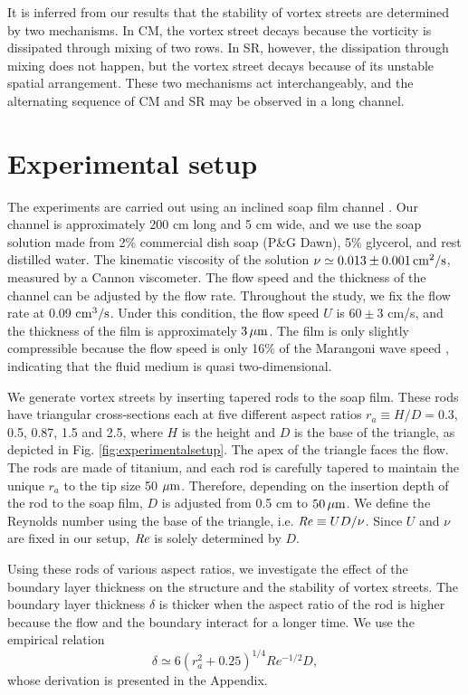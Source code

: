 \documentclass[english, aps, prl, longbibliography, preprint]{revtex4-1}
\newcommand\citepar\citep
\newcommand\micron{{\rm \mu m}}
\newcommand\Reynolds{{\it Re}}
\begin{document}
It is inferred from our results that the stability of vortex streets are determined by two mechanisms.
In CM, the vortex street decays because the vorticity is dissipated through mixing of two rows.
In SR, however, the dissipation through mixing does not happen, but the vortex street decays because of its unstable spatial arrangement.
These two mechanisms act interchangeably, and the alternating sequence of CM and SR may be observed in a long channel.



\section{Experimental setup}

The experiments are carried out using an inclined soap film channel \citepar{Kim:2015jp,Georgiev:2002kg}. 
Our channel is approximately 200 cm long and 5 cm wide, and we use the soap solution made from 2\% commercial dish soap (P\&G Dawn), 5\% glycerol, and rest distilled water. 
The kinematic viscosity of the solution $\nu\simeq0.013\pm0.001\,\rm cm^2/s$, measured by a Cannon viscometer. 
The flow speed and the thickness of the channel can be adjusted by the flow rate. 
Throughout the study, we fix the flow rate at 0.09 $\rm cm^3/s$.
Under this condition, the flow speed $U$ is $60\pm3$ cm/s, and the thickness of the film is approximately $3\,\micron$.
The film is only slightly compressible because the flow speed is only 16\% of the Marangoni wave speed \citepar{Kim:2017dn}, indicating that the fluid medium is quasi two-dimensional.

We generate vortex streets by inserting tapered rods to the soap film.
These rods have triangular cross-sections each at five different aspect ratios $r_a\equiv H/D=$0.3, 0.5, 0.87, 1.5 and 2.5, where $H$ is the height and $D$ is the base of the triangle, as depicted in Fig. \ref{fig:experimentalsetup}.
The apex of the triangle faces the flow.
The rods are made of titanium, and each rod is carefully tapered to maintain the unique $r_a$ to the tip size 50 $\micron$.
Therefore, depending on the insertion depth of the rod to the soap film, $D$ is adjusted from 0.5 cm to $50\,\micron$.
We define the Reynolds number using the base of the triangle, i.e. $\Reynolds\equiv UD/\nu$.
Since $U$ and $\nu$ are fixed in our setup, $\Reynolds$ is solely determined by $D$.

Using these rods of various aspect ratios, we investigate the effect of the boundary layer thickness on the structure and the stability of vortex streets. 
The boundary layer thickness $\delta$ is thicker when the aspect ratio of the rod is higher because the flow and the boundary interact for a longer time.
We use the empirical relation
\begin{equation}
\delta\simeq6\left(r_{a}^{2}+0.25\right)^{1/4}Re^{-1/2}D,
\label{eq:boundary-layer-thickness}
\end{equation}
whose derivation is presented in the Appendix.
\end{document}

